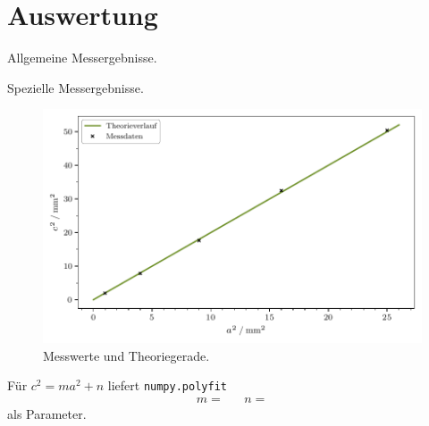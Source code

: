 \section{Auswertung}
\label{sec:auswertung}

\begin{table}
	\label{tab:allgemein}
	\centering
	\caption{Allgemeine Messergebnisse.}
	
\end{table}

\begin{table}
	\label{tab:speziell}
	\centering
	\caption{Spezielle Messergebnisse.}
	
\end{table}

\begin{figure}[H]
	\label{fig:plot}
	\includegraphics{build/plot.pdf}
	\caption{Messwerte und Theoriegerade.}
\end{figure}

Für $c^2 = ma^2 + n$ liefert \verb+numpy.polyfit+ \cite{numpy}
\begin{align*}
	m =  && n = 
\end{align*}
als Parameter.
